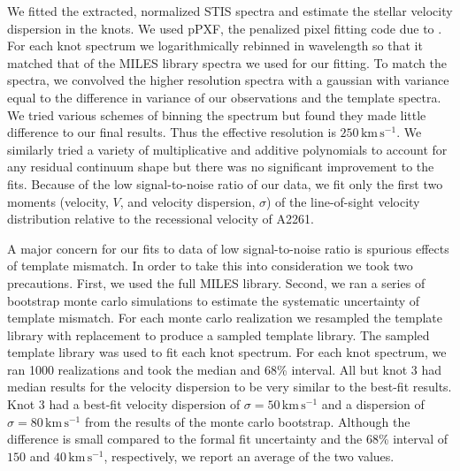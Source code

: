 We fitted the extracted, normalized STIS spectra and estimate the stellar velocity dispersion in the knots.  We used pPXF, the penalized pixel fitting code due to \citet{2004PASP..116..138C}.  
For each knot spectrum we logarithmically rebinned in wavelength so that it matched that of the MILES library spectra \citep{2010MNRAS.404.1639V} we used for our fitting.  To match the spectra, we convolved the higher resolution spectra with a gaussian with variance equal to the difference in variance of our observations and the template spectra.  
We tried various schemes of binning the spectrum but found they made little difference to our final results.  Thus the effective resolution is $250\,\mathrm{km\,s^{-1}}$.    We similarly tried a variety of multiplicative and additive polynomials to account for any residual continuum shape but there was no significant improvement to the fits.  Because of the low signal-to-noise ratio of our data, we fit only the first two moments (velocity, $V$, and velocity dispersion, $\sigma$) of the line-of-sight velocity distribution relative to the recessional velocity of A2261.

A major concern for our fits to data of low signal-to-noise ratio is spurious effects of template mismatch.  In order to take this into consideration we took two precautions.  First, we used the full MILES library.  Second, we ran a series of bootstrap monte carlo simulations to estimate the systematic uncertainty of template mismatch.  For each monte carlo realization we resampled the template library with replacement to produce a sampled template library.  The sampled template library was used to fit each knot spectrum.  For each knot spectrum, we ran 1000 realizations and took the median and 68\% interval.  All but knot 3 had median results for the velocity dispersion to be very similar to the best-fit results.  Knot 3 had a best-fit velocity dispersion of $\sigma = 50\,\mathrm{km\,s^{-1}}$ and a dispersion of $\sigma = 80\,\mathrm{km\,s^{-1}}$ from the results of the monte carlo bootstrap.  Although the difference is small compared to the formal fit uncertainty and the 68\% interval of $150$ and $40\,\mathrm{km\,s^{-1}}$, respectively, we report an average of the two values.

